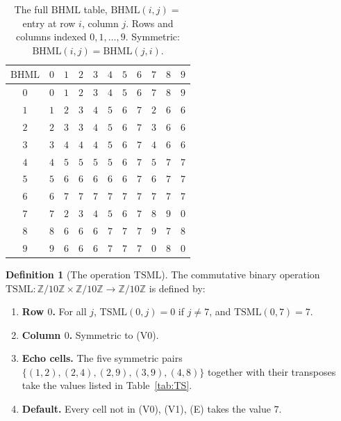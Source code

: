 \documentclass[11pt,reqno]{amsart}
\theoremstyle{plain}
\theoremstyle{definition}
\newtheorem{definition}[theorem]{Definition}
\theoremstyle{remark}
\newcommand{\Z}{\mathbb{Z}}
\newcommand{\TS}{\mathrm{TSML}}
\newcommand{\BH}{\mathrm{BHML}}
\newcommand{\Zten}{\Z/10\Z}
\begin{document}
\begin{table}[h]
\caption{The full $\BH$ table, $\BH(i, j) =$ entry at row $i$,
column $j$. Rows and columns indexed $0, 1, \ldots, 9$.
Symmetric: $\BH(i, j) = \BH(j, i)$.}
\label{tab:BH}
\centering
\begin{tabular}{c|cccccccccc}
$\BH$ & $0$ & $1$ & $2$ & $3$ & $4$ & $5$ & $6$ & $7$ & $8$ & $9$ \\ \hline
$0$ & $0$ & $1$ & $2$ & $3$ & $4$ & $5$ & $6$ & $7$ & $8$ & $9$ \\
$1$ & $1$ & $2$ & $3$ & $4$ & $5$ & $6$ & $7$ & $2$ & $6$ & $6$ \\
$2$ & $2$ & $3$ & $3$ & $4$ & $5$ & $6$ & $7$ & $3$ & $6$ & $6$ \\
$3$ & $3$ & $4$ & $4$ & $4$ & $5$ & $6$ & $7$ & $4$ & $6$ & $6$ \\
$4$ & $4$ & $5$ & $5$ & $5$ & $5$ & $6$ & $7$ & $5$ & $7$ & $7$ \\
$5$ & $5$ & $6$ & $6$ & $6$ & $6$ & $6$ & $7$ & $6$ & $7$ & $7$ \\
$6$ & $6$ & $7$ & $7$ & $7$ & $7$ & $7$ & $7$ & $7$ & $7$ & $7$ \\
$7$ & $7$ & $2$ & $3$ & $4$ & $5$ & $6$ & $7$ & $8$ & $9$ & $0$ \\
$8$ & $8$ & $6$ & $6$ & $6$ & $7$ & $7$ & $7$ & $9$ & $7$ & $8$ \\
$9$ & $9$ & $6$ & $6$ & $6$ & $7$ & $7$ & $7$ & $0$ & $8$ & $0$ \\
\end{tabular}
\end{table}

\begin{definition}[The operation $\TS$]\label{def:TS}
The commutative binary operation $\TS : \Zten \times \Zten
\to \Zten$ is defined by:
\begin{enumerate}\setlength\itemsep{2pt}
\item[\rm (V0)] \textbf{Row $0$.} For all $j$, $\TS(0, j) = 0$
if $j \neq 7$, and $\TS(0, 7) = 7$.
\item[\rm (V1)] \textbf{Column $0$.} Symmetric to (V0).
\item[\rm (E)] \textbf{Echo cells.} The five symmetric pairs
$\{(1,2), (2,4), (2,9), (3,9), (4,8)\}$ together with their
transposes take the values listed in Table~\ref{tab:TS}.
\item[\rm (D)] \textbf{Default.} Every cell not in (V0), (V1),
(E) takes the value $7$.
\end{enumerate}
\end{definition}
\end{document}
